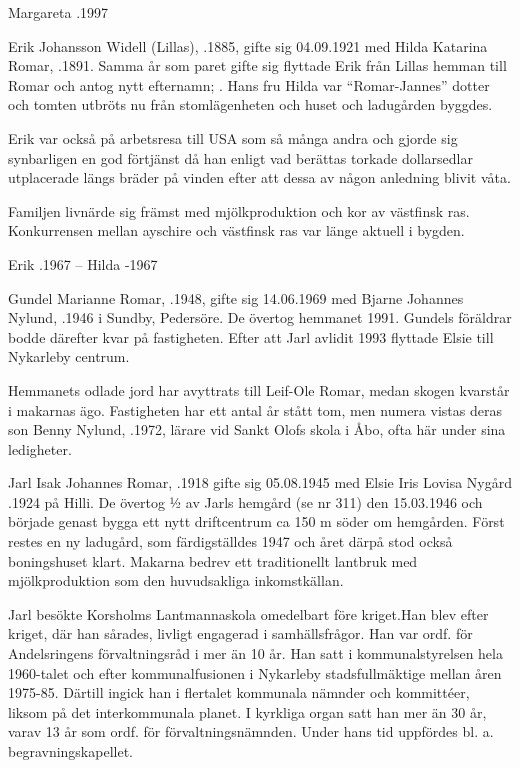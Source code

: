 Margareta .1997


Erik Johansson Widell (Lillas), .1885, gifte sig 04.09.1921 med Hilda Katarina Romar, .1891. Samma år som paret gifte sig flyttade Erik från Lillas hemman till Romar och antog nytt efternamn; . Hans fru Hilda var ``Romar-Jannes'' dotter och tomten utbröts nu från stomlägenheten och huset och ladugården byggdes.

Erik var också på arbetsresa till USA som så många andra och gjorde sig synbarligen en god förtjänst då han enligt vad berättas torkade
dollarsedlar utplacerade längs bräder på vinden efter att dessa av någon anledning blivit våta.

Familjen livnärde sig främst med mjölkproduktion och kor av västfinsk ras. Konkurrensen mellan ayschire och västfinsk ras var länge aktuell i bygden.

Erik .1967  --  Hilda -1967




Gundel Marianne Romar, .1948, gifte sig 14.06.1969 med Bjarne Johannes Nylund, .1946 i Sundby, Pedersöre. De övertog hemmanet 1991. Gundels föräldrar bodde därefter kvar på fastigheten. Efter att Jarl avlidit 1993 flyttade Elsie till Nykarleby centrum.

Hemmanets odlade jord har avyttrats till Leif-Ole Romar, medan skogen kvarstår i makarnas ägo. Fastigheten har ett antal år stått tom, men numera vistas deras son Benny Nylund, .1972, lärare vid Sankt Olofs skola i  Åbo, ofta här under sina ledigheter.





Jarl Isak Johannes Romar, .1918 gifte sig 05.08.1945 med Elsie Iris Lovisa Nygård .1924 på Hilli. De övertog ½ av Jarls hemgård (se nr 311) den 15.03.1946 och började genast bygga ett nytt driftcentrum ca 150 m söder om hemgården. Först restes en ny ladugård, som färdigställdes 1947 och året därpå stod också boningshuset klart. Makarna bedrev ett traditionellt lantbruk med mjölkproduktion som den huvudsakliga inkomstkällan.

Jarl besökte Korsholms Lantmannaskola omedelbart före kriget.Han blev efter kriget, där han sårades, livligt engagerad i samhällsfrågor. Han var ordf. för Andelsringens förvaltningsråd i mer än 10 år. Han satt i kommunalstyrelsen hela 1960-talet och efter kommunalfusionen i Nykarleby stadsfullmäktige mellan åren 1975-85. Därtill ingick han i flertalet kommunala nämnder och kommittéer, liksom på det interkommunala planet. I kyrkliga organ satt han mer än 30 år, varav  13 år som ordf. för förvaltningsnämnden. Under hans tid uppfördes bl. a. begravningskapellet.

